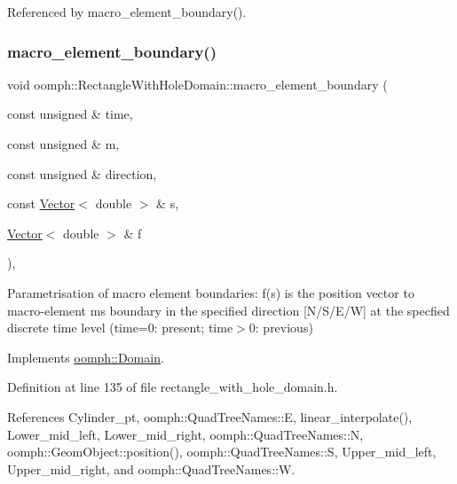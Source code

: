 Referenced by macro\+\_\+element\+\_\+boundary().

\mbox{\label{classoomph_1_1RectangleWithHoleDomain_a514085f80059aa9f0cc3334a3cb408c1}} 
\subsubsection{\texorpdfstring{macro\+\_\+element\+\_\+boundary()}{macro\_element\_boundary()}}
{\footnotesize\ttfamily void oomph\+::\+Rectangle\+With\+Hole\+Domain\+::macro\+\_\+element\+\_\+boundary (\begin{DoxyParamCaption}\item[{const unsigned \&}]{time,  }\item[{const unsigned \&}]{m,  }\item[{const unsigned \&}]{direction,  }\item[{const \hyperlink{classoomph_1_1Vector}{Vector}$<$ double $>$ \&}]{s,  }\item[{\hyperlink{classoomph_1_1Vector}{Vector}$<$ double $>$ \&}]{f }\end{DoxyParamCaption})\hspace{0.3cm}{\ttfamily [inline]}, {\ttfamily [virtual]}}



Parametrisation of macro element boundaries\+: f(s) is the position vector to macro-\/element m\textquotesingle{}s boundary in the specified direction \mbox{[}N/\+S/\+E/W\mbox{]} at the specfied discrete time level (time=0\+: present; time$>$0\+: previous) 



Implements \hyperlink{classoomph_1_1Domain_a95f3e00d28ea37e6c4d3027bfac91096}{oomph\+::\+Domain}.



Definition at line 135 of file rectangle\+\_\+with\+\_\+hole\+\_\+domain.\+h.



References Cylinder\+\_\+pt, oomph\+::\+Quad\+Tree\+Names\+::E, linear\+\_\+interpolate(), Lower\+\_\+mid\+\_\+left, Lower\+\_\+mid\+\_\+right, oomph\+::\+Quad\+Tree\+Names\+::N, oomph\+::\+Geom\+Object\+::position(), oomph\+::\+Quad\+Tree\+Names\+::S, Upper\+\_\+mid\+\_\+left, Upper\+\_\+mid\+\_\+right, and oomph\+::\+Quad\+Tree\+Names\+::W.



